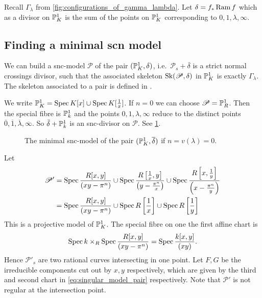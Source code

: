 Recall $\Gamma_\lambda$ from \cref{fig:configurations_of_gamma_lambda}. 
Let $\delta = f_* \operatorname{Ram} f$ which as a divisor on $\mathbb{P}^{1}_K$ is the sum of the points on $\mathbb{P}^{1}_K$ corresponding to $0, 1, \lambda, \infty$. 
\subsection{Finding a minimal scn model} \label{sec:finding_a_minimal_scn_model}
We can build a snc-model $\mathscr P$ of the pair $(\mathbb{P}^{1}_K, \delta)$, i.e.\ $\mathscr P_s + \overline{\delta}$ is a strict normal crossings divisor, such that the associated skeleton $\operatorname{Sk}(\mathscr P, \delta)$ in $\mathbb{P}^{1}_K$ is exactly $\Gamma_\lambda$. 
The skeleton associated to a pair is defined in \cite[§3.2.1]{bakerWeightFunctionsBerkovich2016}.

We write $\mathbb{P}^{1}_K = \operatorname{Spec} K[x] \cup \operatorname{Spec} K[\frac{1}{x}]$.
If $n = 0$ we can choose $\mathscr P = \mathbb{P}^{1}_R$. Then the special fibre is $\mathbb{P}^{1}_k$ and the points $0, 1, \lambda, \infty$ reduce to the distinct points $\overline{0}, \overline{1}, \overline{\lambda}, \overline{\infty}$.
So $\bar{\delta} + \mathbb{P}^{1}_k$ is an snc-divisor on $\mathscr P$. 
See \cref{fig:model_pair_n_1}. 
\begin{figure}[h]
    \centering
    \caption{The minimal snc-model of the pair $(\mathbb{P}^{1}_K, \overline{\delta})$ if $n =v(\lambda) = 0$.}
    \label{fig:model_pair_n_1}
\end{figure}

Let 
\begin{align}\label{eq:singular_model_pair}
	\mathscr P' &= \operatorname{Spec} \frac{R[x, y]}{(xy - \pi^{n})} \cup \operatorname{Spec} \frac{R\left[ \frac{1}{x},y \right]}{\left(y-\frac{\pi^{n}}{x}\right)} \cup \operatorname{Spec} \frac{R\left[x, \frac{1}{y}\right]}{\left(x - \frac{\pi^{n}}{y}\right)} \\
	&=  \operatorname{Spec} \frac{R[x, y]}{(xy - \pi^{n})} \cup \operatorname{Spec} R\left[ \frac{1}{x} \right] \cup \operatorname{Spec} R\left[ \frac{1}{y}\right] \nonumber 
 \end{align} 
This is a projective model of $\mathbb{P}^{1}_K$. 
The special fibre on one the first affine chart is \[
	\operatorname{Spec} k \times _{R} \operatorname{Spec} \frac{R[x, y]}{(xy -\pi^{n})}=\operatorname{Spec}  \frac{k[x, y]}{(xy)}
.\] 
Hence $\mathscr P'_s$ are two rational curves intersecting in one point. 
Let $F, G$ be the irreducible components cut out by $x, y$ respectively, which are given by the third and second chart in \eqref{eq:singular_model_pair} respectively. 
Note that $\mathscr P'$ is not regular at the intersection point.

